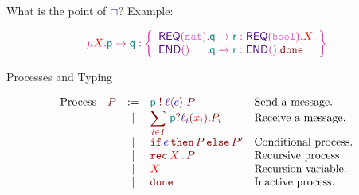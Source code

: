 \begin{frame}{What is the point of $\lmerge$?}
  Example:

  \begin{displaymath}
    \grecur X {
\gmsg \Rp \Rq {\left\{%
  \begin{array}{l@{}l}
   \dlbl{\mathsf{REQ}}(\snat) &. \gmsg \Rq \Rr {\dlbl{\mathsf{REQ}}(\sbool). \pvar{X}} \\
   \dlbl{\mathsf{END}}() &. \gmsg \Rq \Rr {\dlbl{\mathsf{END}}(). \pfinish}
  \end{array}
   \right\}}}
  \end{displaymath}

  \vspace{1cm}

\end{frame}


\begin{frame}{Processes and Typing}

\begin{displaymath}
  \begin{array}{lrcll}
    \text{Process} & \proc{P} & \mathrel{:=} & \psend p \lbl e P & \text{Send a message.} \\
    & & \mid & \precv i I {\precbr p {\lbl_i} {x_i} {P_i}} & \text{Receive a message.} \\
    & & \mid & \pif e P {P'} & \text{Conditional process.} \\
    & & \mid & \precur X P & \text{Recursive process.} \\
    & & \mid & \pvar X & \text{Recursion variable.} \\
    & & \mid & \pfinish & \text{Inactive process.} \\
  \end{array}
\end{displaymath}

\end{frame}

